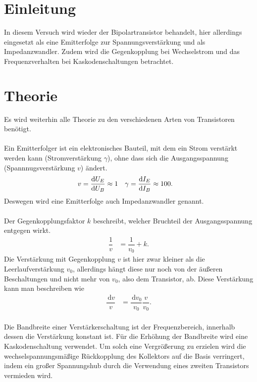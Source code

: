 \documentclass[a4paper,10pt]{article}
\newcommand{\td}{\,\text{d}}
\numberwithin{equation}{section}
\begin{document}
\begin{multicols}{2}
        \sloppy
        \section{Einleitung}
        In diesem Versuch wird wieder der Bipolartransistor behandelt, hier allerdings eingesetzt als eine Emitterfolge zur Spannungsverstärkung und als Impedanzwandler.
        Zudem wird die Gegenkopplung bei Wechselstrom und das Frequenzverhalten bei Kaskodenschaltungen betrachtet.

        \section{Theorie}
        Es wird weiterhin alle Theorie zu den verschiedenen Arten von Transistoren benötigt.
        \\\\ Ein Emitterfolger ist ein elektronisches Bauteil, mit dem ein Strom verstärkt werden kann (Stromverstärkung $\gamma $), ohne dass sich die Ausgangsspannung (Spannnugsverstärkung $v$) ändert.
        \begin{align} 
                v &= \diff[]{U_E}{U_B}\approx 1 & \gamma &= \diff[]{I_E}{I_B}\approx 100
        .\end{align} 
        Deswegen wird eine Emitterfolge auch Impedanzwandler genannt.
        \\\\ Der Gegenkopplungsfaktor $k$ beschreibt, welcher Bruchteil der Ausgangsspannung entgegen wirkt.
        \begin{align} 
                \dfrac{1}{v} &= \dfrac{1}{v_0}+k
        .\end{align} 
        Die Verstärkung mit Gegenkopplung $v$ ist hier zwar kleiner als die Leerlaufverstärkung $v_0$, allerdings hängt diese nur noch von der äußeren Beschaltungen und nicht mehr von $v_0$, also dem Transistor, ab.
        Diese Verstärkung kann man beschreiben wie
        \begin{align} 
                \dfrac{\td v}{v} &= \dfrac{\td v_0}{v_0}\dfrac{v}{v_0}
        .\end{align} 
        \\Die Bandbreite einer Verstärkerschaltung ist der Frequenzbereich, innerhalb dessen die Verstärkung konstant ist.
        Für die Erhöhung der Bandbreite wird eine Kaskodenschaltung verwendet.
        Um solch eine Vergrößerung zu erzielen wird die wechselspannungsmäßige Rückkopplung des Kollektors auf die Basis verringert, indem ein großer Spannungshub durch die Verwendung eines zweiten Transistors vermieden wird.

\end{multicols}
\end{document}
